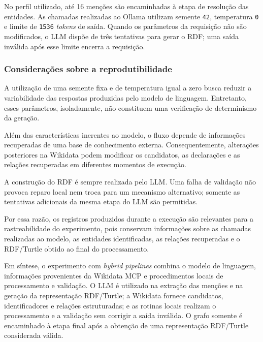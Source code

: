 No perfil utilizado, até 16 menções são encaminhadas à etapa de resolução das entidades. As chamadas realizadas ao Ollama utilizam semente \texttt{42}, temperatura \texttt{0} e limite de \texttt{1536} \textit{tokens} de saída. Quando os parâmetros da requisição não são modificados, o LLM dispõe de três tentativas para gerar o RDF; uma saída inválida após esse limite encerra a requisição.


\subsubsection{Considerações sobre a reprodutibilidade}

A utilização de uma semente fixa e de temperatura igual a zero busca reduzir a variabilidade das respostas produzidas pelo modelo de linguagem. Entretanto, esses parâmetros, isoladamente, não constituem uma verificação de determinismo da geração.

Além das características inerentes ao modelo, o fluxo depende de informações recuperadas de uma base de conhecimento externa. Consequentemente, alterações posteriores na Wikidata podem modificar os candidatos, as declarações e as relações recuperadas em diferentes momentos de execução.

A construção do RDF é sempre realizada pelo LLM. Uma falha de validação não provoca reparo local nem troca para um mecanismo alternativo; somente as tentativas adicionais da mesma etapa do LLM são permitidas.

Por essa razão, os registros produzidos durante a execução são relevantes para a rastreabilidade do experimento, pois conservam informações sobre as chamadas realizadas ao modelo, as entidades identificadas, as relações recuperadas e o RDF/Turtle obtido ao final do processamento.

Em síntese, o experimento com \textit{hybrid pipelines} combina o modelo de linguagem, informações provenientes da Wikidata MCP e procedimentos locais de processamento e validação. O LLM é utilizado na extração das menções e na geração da representação RDF/Turtle; a Wikidata fornece candidatos, identificadores e relações estruturadas; e as rotinas locais realizam o processamento e a validação sem corrigir a saída inválida. O grafo somente é encaminhado à etapa final após a obtenção de uma representação RDF/Turtle considerada válida.
